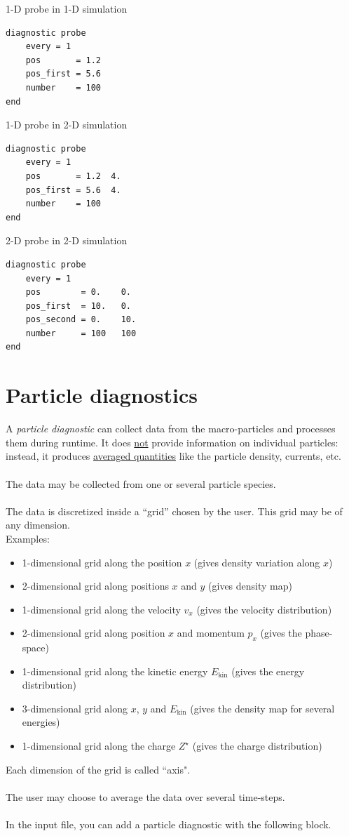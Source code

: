\documentclass[11pt]{article}
\begin{document}
1-D probe in 1-D simulation
\begin{lstlisting}
diagnostic probe
    every = 1
    pos       = 1.2
    pos_first = 5.6
    number    = 100
end
\end{lstlisting}

1-D probe in 2-D simulation
\begin{lstlisting}
diagnostic probe
    every = 1
    pos       = 1.2  4.
    pos_first = 5.6  4.
    number    = 100
end
\end{lstlisting}

2-D probe in 2-D simulation
\begin{lstlisting}
diagnostic probe
    every = 1
    pos        = 0.    0.
    pos_first  = 10.   0.
    pos_second = 0.    10.
    number     = 100   100
end
\end{lstlisting}

\clearpage



\section{Particle diagnostics}

A \textit{particle diagnostic} can collect data from the macro-particles and processes them during runtime.
It does \underline{not} provide information on individual particles: instead, it produces \underline{averaged quantities}
like the particle density, currents, etc.\\
\\
The data may be collected from one or several particle species.\\
\\
The data is discretized inside a ``grid'' chosen by the user. This grid may be of any dimension.\\
Examples:
\begin{itemize}
\item 1-dimensional grid along the position $x$ (gives density variation along $x$)
\item 2-dimensional grid along positions $x$ and $y$ (gives density map)
\item 1-dimensional grid along the velocity $v_x$ (gives the velocity distribution)
\item 2-dimensional grid along position $x$ and momentum $p_x$ (gives the phase-space)
\item 1-dimensional grid along the kinetic energy $E_\mathrm{kin}$ (gives the energy distribution)
\item 3-dimensional grid along $x$, $y$ and $E_\mathrm{kin}$ (gives the density map for several energies)
\item 1-dimensional grid along the charge $Z^\star$ (gives the charge distribution)
\end{itemize}
Each dimension of the grid is called ``axis".\\
\\
The user may choose to average the data over several time-steps.\\
\\
In the input file, you can add a particle diagnostic with the following block.
\end{document}
